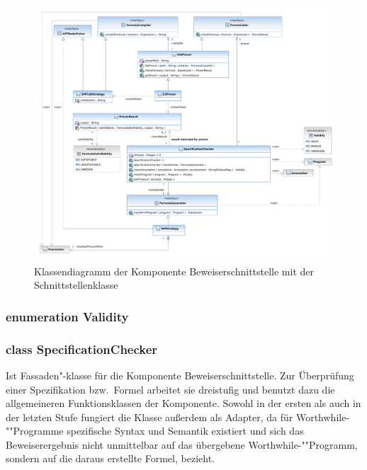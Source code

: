 \begin{figure}[p]%
    \hspace{-4cm}%
    \includegraphics[width=1.5\textwidth]{diagrams/prover_component.pdf}%

    \caption{Klassendiagramm der Komponente Beweiserschnittstelle mit
    der Schnittstellenklasse }%

\end{figure}%

\subsubsection{enumeration Validity}%

\begin{description}%



\end{description}%

\subsubsection{class SpecificationChecker}%

Ist Fassaden"-klasse für die Komponente Beweiserschnittstelle. Zur
Überprüfung einer Spezifikation bzw.\ Formel arbeitet sie dreistufig
und benutzt dazu die allgemeineren Funktionsklassen der Komponente.
Sowohl in der ersten als auch in der letzten Stufe fungiert die Klasse
außerdem als Adapter, da für Worthwhile-""Programme spezifische Syntax
und Semantik existiert und sich das Beweiserergebnis nicht unmittelbar
auf das übergebene Worthwhile-""Programm, sondern auf die daraus
erstellte Formel, bezieht.%

